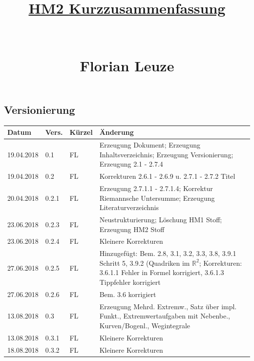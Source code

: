 \documentclass[12pt,a4paper]{article}%
\numberwithin{equation}{section}
\newcommand{\R}{\mathbb{R}} %
\numberwithin{equation}{subsection}
\begin{document}


\author{}
\title{\underline{HM2 Kurzzusammenfassung} \\ $\;$ \\ $\;$ \\ Florian Leuze}
\date{}

\maketitle %
\newpage
\tableofcontents

  \subsection*{Versionierung}
  \begin{tabular}{|p{2cm}|p{1cm}|p{1.5cm}|p{8.5cm}|}\hline
    Datum & Vers. & Kürzel & Änderung \\ \hline
    19.04.2018 & 0.1 & FL & Erzeugung Dokument; Erzeugung Inhaltsverzeichnis; Erzeugung Versionierung; Erzeugung 2.1 - 2.7.4 \\ \hline
    19.04.2018 & 0.2 & FL & Korrekturen 2.6.1 - 2.6.9 u. 2.7.1 - 2.7.2 Titel\\ \hline
    20.04.2018 & 0.2.1 & FL & Erzeugung 2.7.1.1 - 2.7.1.4; Korrektur Riemannsche Untersumme; Erzeugung Literaturverzeichnis \\ \hline
    23.06.2018 & 0.2.3 & FL & Neustrukturierung; Löschung HM1 Stoff; Erzeugung HM2 Stoff \\ \hline
    23.06.2018 & 0.2.4 & FL & Kleinere Korrekturen \\ \hline
    27.06.2018 & 0.2.5 & FL & Hinzugefügt: Bem. 2.8, 3.1, 3.2, 3.3, 3.8, 3.9.1 Schritt 5, 3.9.2 (Quadriken im $\R^2$; Korrekturen: 3.6.1.1 Fehler in Formel korrigiert, 3.6.1.3 Tippfehler korrigiert \\ \hline
    27.06.2018 & 0.2.6 & FL &  Bem. 3.6 korrigiert \\ \hline
    13.08.2018 & 0.3 & FL & Erzeugung Mehrd. Extremw., Satz über impl. Funkt., Extremwertaufgaben mit Nebenbe., Kurven/Bogenl., Wegintegrale \\ \hline
    13.08.2018 & 0.3.1 & FL & Kleinere Korrekturen \\ \hline
    18.08.2018 & 0.3.2 & FL & Kleinere Korrekturen \\ \hline
  \end{tabular}
\listoffigures
\end{document}
